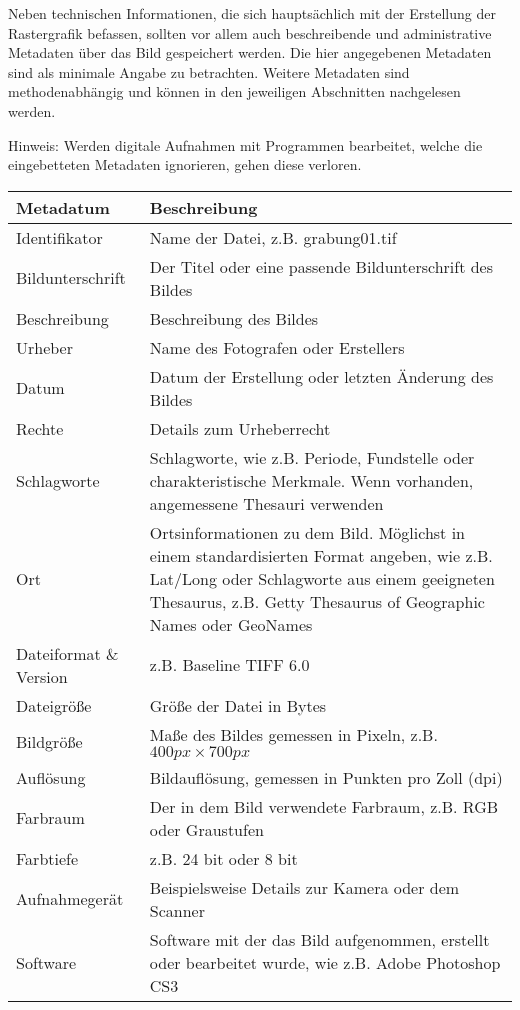 Neben technischen Informationen, die sich hauptsächlich mit der Erstellung der Rastergrafik befassen, sollten vor allem auch beschreibende und administrative Metadaten über das Bild gespeichert werden. Die hier angegebenen Metadaten sind als minimale Angabe zu betrachten. Weitere Metadaten sind methodenabhängig und können in den jeweiligen Abschnitten nachgelesen werden.

Hinweis: Werden digitale Aufnahmen mit Programmen bearbeitet, welche die eingebetteten Metadaten ignorieren, gehen diese verloren. 

\begin{center}
	\begin{tabular}{l p{}}
		\toprule
		Metadatum & Beschreibung \\ \midrule
		Identifikator & Name der Datei, z.B. grabung01.tif \\
		Bildunterschrift & Der Titel oder eine passende Bildunterschrift des Bildes \\
		Beschreibung & Beschreibung des Bildes  \\
		Urheber & Name des Fotografen oder Erstellers \\
		Datum & Datum der Erstellung oder letzten Änderung des Bildes\\
		Rechte & Details zum Urheberrecht \\
		Schlagworte & Schlagworte, wie z.B. Periode, Fundstelle oder charakteristische Merkmale. Wenn vorhanden, angemessene Thesauri verwenden\\
		Ort & Ortsinformationen zu dem Bild. Möglichst in einem standardisierten Format angeben, wie z.B. Lat/Long oder Schlagworte aus einem geeigneten Thesaurus, z.B. Getty Thesaurus of Geographic Names oder GeoNames \\
		Dateiformat \& Version & z.B. Baseline TIFF 6.0 \\
		Dateigröße & Größe der Datei in Bytes \\
		Bildgröße & Maße des Bildes gemessen in Pixeln, z.B. $400px \times 700px$ \\
		Auflösung & Bildauflösung, gemessen in Punkten pro Zoll (dpi) \\
		Farbraum & Der in dem Bild verwendete Farbraum, z.B. RGB oder Graustufen \\
		Farbtiefe & z.B. 24 bit oder 8 bit \\
		Aufnahmegerät & Beispielsweise Details zur Kamera oder dem Scanner \\
		Software & Software mit der das Bild aufgenommen, erstellt oder bearbeitet wurde, wie z.B. Adobe Photoshop CS3 \\ 
 		\bottomrule    
	\end{tabular}
\end{center}


